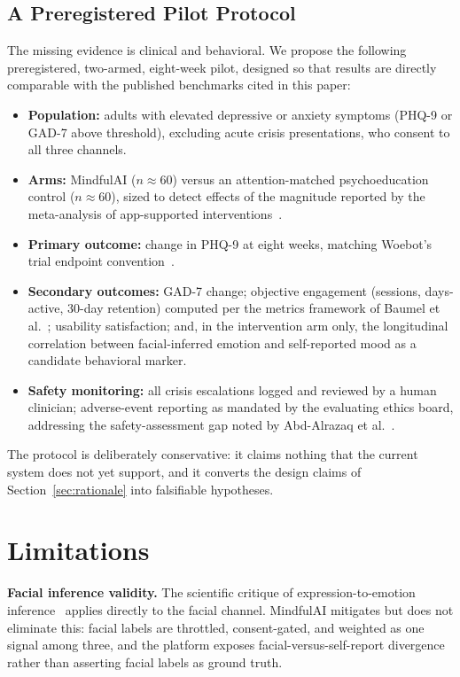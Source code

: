 \documentclass[11pt,a4paper]{article}
\newcommand{\system}{MindfulAI}
\begin{document}
\subsection{A Preregistered Pilot Protocol}

The missing evidence is clinical and behavioral. We propose the following preregistered, two-armed, eight-week pilot, designed so that results are directly comparable with the published benchmarks cited in this paper:

\begin{itemize}[leftmargin=2em, itemsep=2pt]
    \item \textbf{Population:} adults with elevated depressive or anxiety symptoms (PHQ-9 or GAD-7 above threshold), excluding acute crisis presentations, who consent to all three channels.
    \item \textbf{Arms:} \system{} ($n \approx 60$) versus an attention-matched psychoeducation control ($n \approx 60$), sized to detect effects of the magnitude reported by the meta-analysis of app-supported interventions~\cite{linardon2019}.
    \item \textbf{Primary outcome:} change in PHQ-9 at eight weeks, matching Woebot's trial endpoint convention~\cite{fitzpatrick2017}.
    \item \textbf{Secondary outcomes:} GAD-7 change; objective engagement (sessions, days-active, 30-day retention) computed per the metrics framework of Baumel et al.~\cite{baumel2019}; usability satisfaction; and, in the intervention arm only, the longitudinal correlation between facial-inferred emotion and self-reported mood as a candidate behavioral marker.
    \item \textbf{Safety monitoring:} all crisis escalations logged and reviewed by a human clinician; adverse-event reporting as mandated by the evaluating ethics board, addressing the safety-assessment gap noted by Abd-Alrazaq et al.~\cite{abdalrazaq2020}.
\end{itemize}

The protocol is deliberately conservative: it claims nothing that the current system does not yet support, and it converts the design claims of Section~\ref{sec:rationale} into falsifiable hypotheses.

\section{Limitations}\label{sec:limitations}

\textbf{Facial inference validity.} The scientific critique of expression-to-emotion inference~\cite{barrett2019} applies directly to the facial channel. \system{} mitigates but does not eliminate this: facial labels are throttled, consent-gated, and weighted as one signal among three, and the platform exposes facial-versus-self-report divergence rather than asserting facial labels as ground truth.
\end{document}
